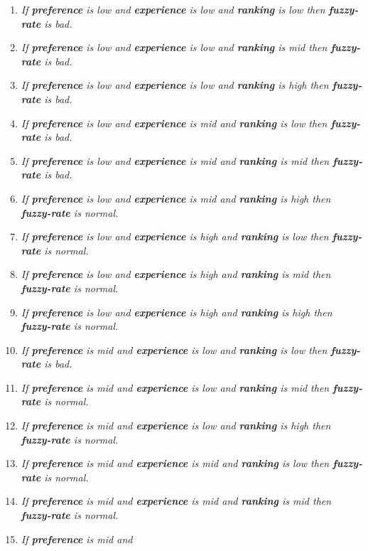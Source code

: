 \begin{enumerate}
\item \textit{If \textbf{preference} is low and 
\textbf{experience} is low and \textbf{ranking} is low then \textbf{fuzzy-rate} is bad.}
\item \textit{If \textbf{preference} is low and 
\textbf{experience} is low and \textbf{ranking} is mid then \textbf{fuzzy-rate} is bad.}
\item \textit{If \textbf{preference} is low and 
\textbf{experience} is low and \textbf{ranking} is high then \textbf{fuzzy-rate} is bad.}
\item \textit{If \textbf{preference} is low and 
\textbf{experience} is mid and \textbf{ranking} is low then \textbf{fuzzy-rate} is bad.}
\item \textit{If \textbf{preference} is low and 
\textbf{experience} is mid and \textbf{ranking} is mid then \textbf{fuzzy-rate} is bad.}
\item \textit{If \textbf{preference} is low and 
\textbf{experience} is mid and \textbf{ranking} is high then \textbf{fuzzy-rate} is normal.}
\item \textit{If \textbf{preference} is low and 
\textbf{experience} is high and \textbf{ranking} is low then \textbf{fuzzy-rate} is normal.}
\item \textit{If \textbf{preference} is low and 
\textbf{experience} is high and \textbf{ranking} is mid then \textbf{fuzzy-rate} is normal.}
\item \textit{If \textbf{preference} is low and 
\textbf{experience} is high and \textbf{ranking} is high then \textbf{fuzzy-rate} is normal.}
\item \textit{If \textbf{preference} is mid and 
\textbf{experience} is low and \textbf{ranking} is low then \textbf{fuzzy-rate} is bad.}
\item \textit{If \textbf{preference} is mid and 
\textbf{experience} is low and \textbf{ranking} is mid then \textbf{fuzzy-rate} is normal.}
\item \textit{If \textbf{preference} is mid and 
\textbf{experience} is low and \textbf{ranking} is high then \textbf{fuzzy-rate} is normal.}
\item \textit{If \textbf{preference} is mid and 
\textbf{experience} is mid and \textbf{ranking} is low then \textbf{fuzzy-rate} is normal.}
\item \textit{If \textbf{preference} is mid and 
\textbf{experience} is mid and \textbf{ranking} is mid then \textbf{fuzzy-rate} is normal.}
\item \textit{If \textbf{preference} is mid and 
}
\end{enumerate}
